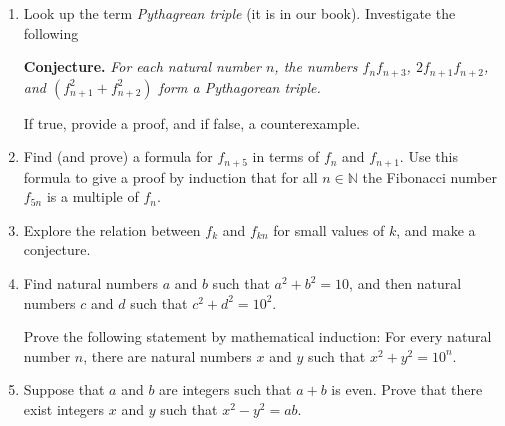 \documentclass[12pt]{article}
\newcommand{\NN}{{\mathbb N}}  %
\newcommand{\demph}[1]{{\color{blue}\sl{#1}}}
\begin{document}
\begin{enumerate}  %



\item Look up the term \demph{Pythagrean triple} (it is in our book).
    Investigate the following

  {\bf Conjecture.}  {\sl For each natural number $n$, the numbers $f_nf_{n+3}$,
  $2f_{n+1}f_{n+2}$, and $(f_{n+1}^2+f_{n+2}^2)$ form a {\color{Blue}Pythagorean triple}.}

   If true, provide a proof, and if false, a counterexample.


 \item 
   Find (and prove) a formula for $f_{n+5}$ in terms of $f_n$ and $f_{n+1}$.
          Use this formula to give a proof by induction that for all $n\in\NN$ the
          Fibonacci number $f_{5n}$ is a multiple of $f_n$.


 \item   Explore the relation between $f_k$ and $f_{kn}$ for small values of $k$, and make a conjecture.


 \item   Find natural numbers $a$ and $b$ such that $a^2+b^2=10$, and then natural numbers $c$ and $d$ such that
   $c^2+d^2=10^2$.

   Prove the following statement by mathematical induction:
   For every natural number $n$, there are natural numbers $x$ and $y$ such that $x^2+y^2=10^n$.
   


\item  Suppose that $a$ and $b$ are integers such that $a+b$ is even.
  Prove that there exist integers $x$ and $y$ such that $x^2-y^2=ab$.


\end{enumerate}
\end{document}
